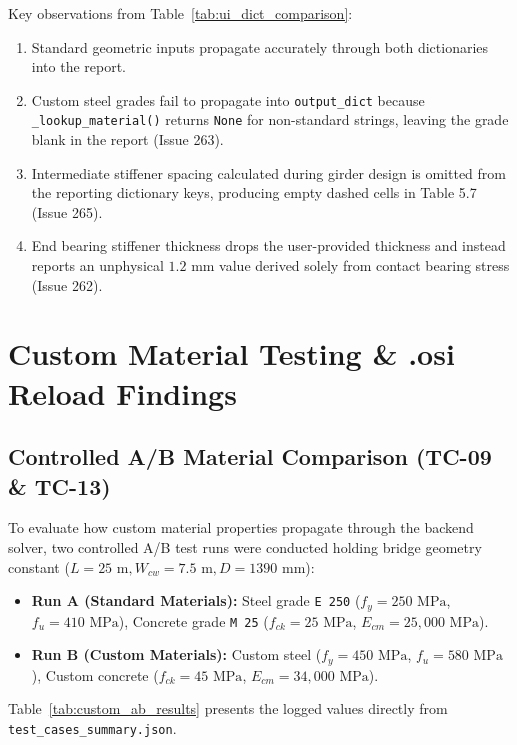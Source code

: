 \documentclass[11pt,a4paper]{article}
\begin{document}
Key observations from Table~\ref{tab:ui_dict_comparison}:
\begin{enumerate}
    \item Standard geometric inputs propagate accurately through both dictionaries into the report.
    \item Custom steel grades fail to propagate into \texttt{output\_dict} because \texttt{\_lookup\_material()} returns \texttt{None} for non-standard strings, leaving the grade blank in the report (Issue 263).
    \item Intermediate stiffener spacing calculated during girder design is omitted from the reporting dictionary keys, producing empty dashed cells in Table 5.7 (Issue 265).
    \item End bearing stiffener thickness drops the user-provided thickness and instead reports an unphysical $1.2\text{ mm}$ value derived solely from contact bearing stress (Issue 262).
\end{enumerate}

\section{Custom Material Testing \& .osi Reload Findings}

\subsection{Controlled A/B Material Comparison (TC-09 \& TC-13)}
To evaluate how custom material properties propagate through the backend solver, two controlled A/B test runs were conducted holding bridge geometry constant ($L = 25\text{ m}, W_{cw} = 7.5\text{ m}, D = 1390\text{ mm}$):
\begin{itemize}
    \item \textbf{Run A (Standard Materials):} Steel grade \texttt{E 250} ($f_y = 250\text{ MPa}$, $f_u = 410\text{ MPa}$), Concrete grade \texttt{M 25} ($f_{ck} = 25\text{ MPa}$, $E_{cm} = 25,000\text{ MPa}$).
    \item \textbf{Run B (Custom Materials):} Custom steel ($f_y = 450\text{ MPa}$, $f_u = 580\text{ MPa}$), Custom concrete ($f_{ck} = 45\text{ MPa}$, $E_{cm} = 34,000\text{ MPa}$).
\end{itemize}

Table~\ref{tab:custom_ab_results} presents the logged values directly from \texttt{test\_cases\_summary.json}.
\end{document}
